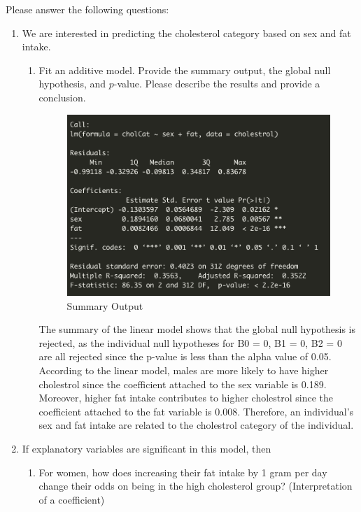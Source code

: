 \documentclass[12pt,letterpaper]{article}
\begin{document}
\newpage
\noindent Please answer the following questions:

\begin{enumerate}
	\item
	We are interested in predicting the cholesterol category based on sex and fat intake.
	\begin{enumerate}
		\item
		Fit an additive model. Provide the summary output, the global null hypothesis, and $p$-value. Please describe the results and provide a conclusion.
		  
			
			\begin{figure} [h]
			\centering
			\includegraphics[width=0.7\linewidth]{summary output.png}
			\caption{Summary Output}
			\label{}
		\end{figure}
	
		The summary of the linear model shows that the global null hypothesis is rejected, as the individual null hypotheses for B0 = 0, B1 = 0, B2 = 0 are all rejected since the p-value is less than the alpha value of 0.05. According to the linear model, males are more likely to have higher cholestrol since the coefficient attached to the sex variable is 0.189. Moreover, higher fat intake contributes to higher cholestrol since the coefficient attached to the fat variable is 0.008. Therefore, an individual's sex and fat intake are related to the cholestrol category of the individual.
		
	\end{enumerate}
	
	\item
	If explanatory variables are significant in this model, then
	\begin{enumerate}
		\item
		For women, how does increasing their fat intake by 1 gram per day change their odds on being in the high cholesterol group? (Interpretation of a coefficient)
		

\end{enumerate}
\end{enumerate}
\end{document}
